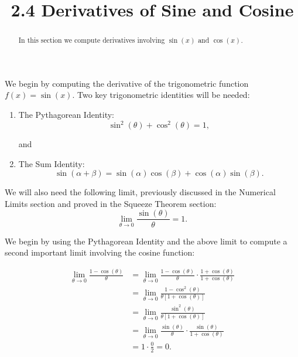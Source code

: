\documentclass[handout]{ximera}
\title{2.4 Derivatives of Sine and Cosine}
\begin{document}
\begin{abstract}
In this section we compute derivatives involving $\sin(x)$ and $\cos(x)$.
\end{abstract}

\maketitle


We begin by computing the derivative of the trigonometric function $f(x) = \sin(x)$.  
Two key trigonometric identities will be needed:
\begin{enumerate}
\item The Pythagorean Identity:
\[
\sin^2(\theta) + \cos^2(\theta) = 1,
\]
\begin{center}
and
\end{center}
\item The Sum Identity:
\[
\sin(\alpha + \beta) = \sin(\alpha)\cos(\beta) + \cos(\alpha)\sin(\beta).
\]
\end{enumerate}

We will also need the following limit, previously discussed in the Numerical Limits section and proved in the Squeeze Theorem section:
\[
\lim_{\theta \to 0} \frac{\sin(\theta)}{\theta} = 1.
\]

We begin by using  the Pythagorean Identity and the above limit
to compute a second important limit involving the cosine function:

\begin{align*}
\lim_{\theta \to 0} \frac{1 - \cos(\theta)}{\theta} &= \lim_{\theta \to 0} \frac{1 - \cos(\theta)}{\theta} \cdot \frac{1 + \cos(\theta)}{1 + \cos(\theta)}\\
&= \lim_{\theta \to 0} \frac{1 - \cos^2(\theta)}{\theta[1 + \cos(\theta)]}\\
&= \lim_{\theta \to 0} \frac{\sin^2(\theta)}{\theta[1 + \cos(\theta)]}\\
&= \lim_{\theta \to 0} \frac{\sin(\theta)}{\theta} \cdot \frac{\sin(\theta)}{1 + \cos(\theta)}\\
&= 1 \cdot \frac{0}{2} = 0.
\end{align*}
\end{document}
